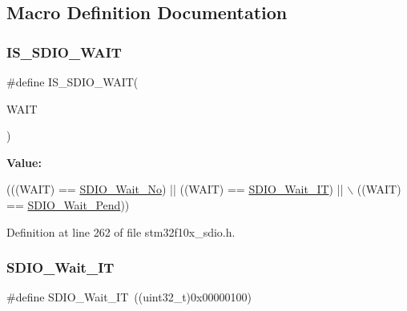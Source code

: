 \subsection{Macro Definition Documentation}
\mbox{\label{group___s_d_i_o___wait___interrupt___state_ga7ee5c289c8e06a76b849808d15b03810}} 
\subsubsection{\texorpdfstring{I\+S\+\_\+\+S\+D\+I\+O\+\_\+\+W\+A\+IT}{IS\_SDIO\_WAIT}}
{\footnotesize\ttfamily \#define I\+S\+\_\+\+S\+D\+I\+O\+\_\+\+W\+A\+IT(\begin{DoxyParamCaption}\item[{}]{W\+A\+IT }\end{DoxyParamCaption})}

{\bfseries Value\+:}
\begin{DoxyCode}
(((WAIT) == \hyperlink{group___s_d_i_o___wait___interrupt___state_ga266294e1ffd7a4b45e62bff753ca44b2}{SDIO\_Wait\_No}) || ((WAIT) == \hyperlink{group___s_d_i_o___wait___interrupt___state_ga3914bbe26a656c8e151272ccdc12c71c}{SDIO\_Wait\_IT}) || \(\backslash\)
                            ((WAIT) == \hyperlink{group___s_d_i_o___wait___interrupt___state_ga2a4104023a7f8403ddd159ec3bbb8592}{SDIO\_Wait\_Pend}))
\end{DoxyCode}


Definition at line 262 of file stm32f10x\+\_\+sdio.\+h.

\mbox{\label{group___s_d_i_o___wait___interrupt___state_ga3914bbe26a656c8e151272ccdc12c71c}} 
\subsubsection{\texorpdfstring{S\+D\+I\+O\+\_\+\+Wait\+\_\+\+IT}{SDIO\_Wait\_IT}}
{\footnotesize\ttfamily \#define S\+D\+I\+O\+\_\+\+Wait\+\_\+\+IT~((uint32\+\_\+t)0x00000100)}

